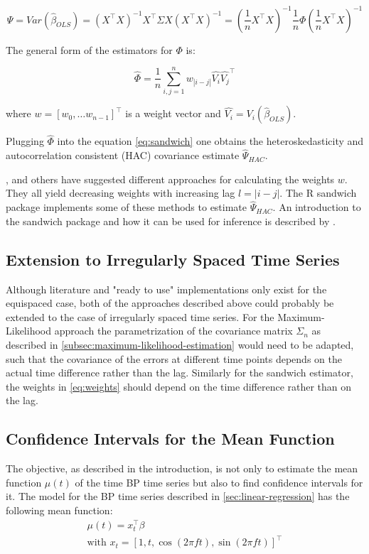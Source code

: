 \begin{equation}\label{eq:sandwich}
\Psi = Var(\hat \beta_{OLS}) = (X^{\top} X)^{-1} X^{\top} \Sigma X (X^{\top}X)^{-1} =
(\frac{1}{n} X^{\top} X)^{-1} \frac{1}{n} \Phi (\frac{1}{n} X^{\top} X)^{-1}
\end{equation}

The general form of the estimators for $\Phi$ is:

\begin{equation}\label{eq:weights}
\hat{\Phi} = \frac{1}{n} \sum_{i,j=1}^{n} w_{|i-j|}\hat{V_i}\hat{V_j}^{\top}
\end{equation}

where $w=[w_0, \dots w_{n-1}]^{\top}$ is a weight vector and $\hat{V_i} = V_i(\hat{\beta}_{OLS})$.

Plugging $\hat{\Phi}$ into the equation \ref{eq:sandwich} one obtains the
heteroskedasticity and autocorrelation consistent (HAC) covariance estimate $\hat{\Psi}_{HAC}$.



\citeauthor{newey_automatic_1994}, \citeauthor{andrews_heteroskedasticity_1991} and others have suggested different approaches
for calculating the weights $w$. They all yield decreasing weights with increasing lag $l=|i-j|$.
The R sandwich package implements some of these methods to estimate $\hat{\Psi}_{HAC}$.
An introduction to the sandwich package and how it can be used
for inference is described by \citeauthor{zeileis_econometric_2004}.


\subsection{Extension to Irregularly Spaced Time Series}

Although literature and "ready to use" implementations only exist for the equispaced case,
both of the approaches described above could probably be extended to the case of irregularly spaced time series.
For the Maximum-Likelihood approach the parametrization of the covariance matrix $\Sigma_n$ as described in
\ref{subsec:maximum-likelihood-estimation} would need to be adapted,
such that the covariance of the errors at different time points depends on the actual time difference rather than the lag.
Similarly for the sandwich estimator, the weights in \ref{eq:weights} should depend on the time difference rather than on the lag.


\subsection{Confidence Intervals for the Mean Function}
The objective, as described in the introduction, is not only to estimate the mean function $\mu(t)$ of the time BP
time series but also to find confidence intervals for it.
The model for the BP time series described in \ref{sec:linear-regression} has the following mean function:
\begin{gather*}
    \mu(t) = x_{t}^{\top} \beta \\
    \text{with $x_{t} = [1, t, \cos(2 \pi f t), \sin(2 \pi f t)]^{\top}$}
\end{gather*}

